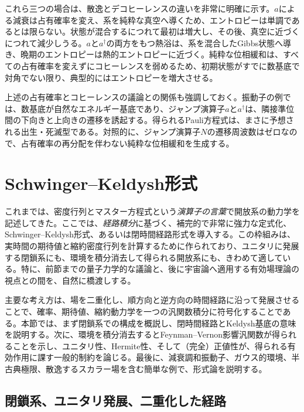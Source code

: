 \documentclass[a4paper,11pt,oneside]{article}
\theoremstyle{definition}
\numberwithin{equation}{section}
\begin{document}
これら三つの場合は、散逸とデコヒーレンスの違いを非常に明確に示す。$a$による減衰は占有確率を変え、系を純粋な真空へ導くため、エントロピーは単調であるとは限らない。状態が混合するにつれて最初は増大し、その後、真空に近づくにつれて減少しうる。$a$と$a^\dagger$の両方をもつ熱浴は、系を混合したGibbs状態へ導き、晩期のエントロピーは熱的エントロピーに近づく。純粋な位相緩和は、すべての占有確率を変えずにコヒーレンスを弱めるため、初期状態がすでに数基底で対角でない限り、典型的にはエントロピーを増大させる。



上述の占有確率とコヒーレンスの議論との関係も強調しておく。振動子の例では、数基底が自然なエネルギー基底であり、ジャンプ演算子$a$と$a^\dagger$は、隣接準位間の下向きと上向きの遷移を誘起する。得られるPauli方程式は、まさに予想される出生・死滅型である。対照的に、ジャンプ演算子$N$の遷移周波数はゼロなので、占有確率の再分配を伴わない純粋な位相緩和を生成する。






\section{Schwinger--Keldysh形式}\label{sec:4}



これまでは、密度行列とマスター方程式という\textit{演算子の言葉}で開放系の動力学を記述してきた。ここでは、\textit{経路積分}に基づく、補完的で非常に強力な定式化、Schwinger--Keldysh形式、あるいは閉時間経路形式\cite{Schwinger:1960qe,Keldysh:1964ud}を導入する。この枠組みは、実時間の期待値と縮約密度行列を計算するために作られており、ユニタリに発展する閉鎖系にも、環境を積分消去して得られる開放系にも、きわめて適している。特に、前節までの量子力学的な議論と、後に宇宙論へ適用する有効場理論の視点との間を、自然に橋渡しする。



主要な考え方は、場を二重化し、順方向と逆方向の時間経路に沿って発展させることで、確率、期待値、縮約動力学を一つの汎関数積分に符号化することである。本節では、まず閉鎖系での構成を概説し、閉時間経路とKeldysh基底の意味を説明する。次に、環境を積分消去するとFeynman--Vernon影響汎関数が得られることを示し、ユニタリ性、Hermite性、そして（完全）正値性が、得られる有効作用に課す一般的制約を論じる。最後に、減衰調和振動子、ガウス的環境、半古典極限、散逸するスカラー場を含む簡単な例で、形式論を説明する。





\subsection{閉鎖系、ユニタリ発展、二重化した経路}
\end{document}
